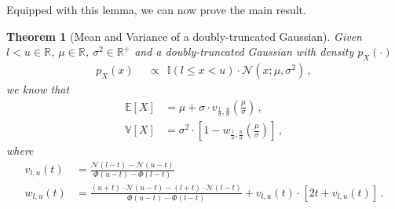 \documentclass[a4paper]{article}
\newcommand{\Real}{{\mathbb R}}
\newcommand{\Normal}[3]{{\mathcal N} \left({#1};{#2},{#3}\right)}
\newcommand{\NormalStandard}[1]{{\mathcal N} \left({#1}\right)}
\newcommand{\NormalStandardCDF}[1]{\Phi \left({#1}\right)}
\newcommand{\expect}[1]{{\mathbb E \left[ {#1} \right]}}
\newcommand{\var}[1]{{\mathbb V \left[ {#1} \right]}}
\newcommand{\identity}[1]{{{\mathbb{I}} \left( {#1} \right)}}
\newtheorem{theorem}{Theorem}
\theoremstyle{definition}
\begin{document}
Equipped with this lemma, we can now prove the main result.
\begin{theorem}[Mean and Variance of a doubly-truncated Gaussian] Given $l < u \in \Real$, $\mu \in \Real$, $\sigma^2 \in \Real^+$ and a doubly-truncated Gaussian with density $p_X(\cdot)$ 
    \begin{align}
        p_X(x)\ \  & \propto \ \ \identity{l \leq x < u} \cdot \Normal{x}{\mu}{\sigma^2} \nonumber \,,
    \end{align}
    we know that
    \begin{align}
        \expect{X} & = \mu + \sigma \cdot v_{\frac{l}{\sigma},\frac{u}{\sigma}}\left( \frac{\mu}{\sigma} \right)\,, \label{eq:doubly_truncated_gaussian_expecation} \\
        \var{X} & = \sigma^2 \cdot \left[1 - w_{\frac{l}{\sigma},\frac{u}{\sigma}}\left( \frac{\mu}{\sigma} \right) \right] \,, \label{eq:doubly_truncated_variance} 
    \end{align}
    where
    \begin{align}
        v_{l,u}\left( t \right) & =  \frac{\NormalStandard{l - t} - \NormalStandard{u - t}}{\NormalStandardCDF{u - t} - \NormalStandardCDF{l - t}} \label{eq:doubly_truncated_v_function} \\
        w_{l,u}\left( t \right) & =  \frac{\left( u + t \right) \cdot \NormalStandard{u - t} - \left( l + t \right) \cdot \NormalStandard{l - t}}{\NormalStandardCDF{u - t} - \NormalStandardCDF{l - t}} + v_{l,u}\left( t \right) \cdot \left[ 2t + v_{l,u}\left( t \right) \right]\,. \label{eq:doubly_truncated_w_function} 
    \end{align}
\end{theorem}
\end{document}
